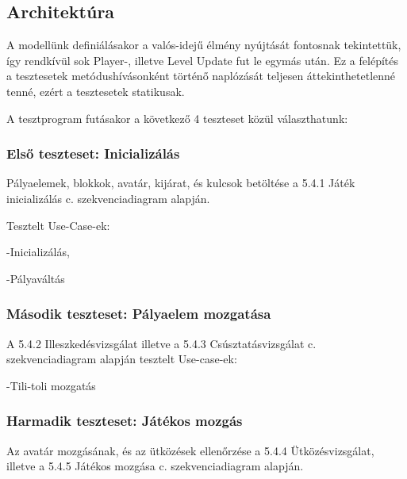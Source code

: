 \begin{usecase}
\end{usecase}

\begin{usecase}
\end{usecase}
\pagebreak 
\subsection{Architektúra}

	A modellünk definiálásakor a valós-idejű élmény nyújtását fontosnak tekintettük, így rendkívül sok Player-, illetve Level Update fut le egymás után. Ez a felépítés a tesztesetek metódushívásonként történő naplózását teljesen áttekinthetetlenné tenné, ezért a tesztesetek statikusak.

	A tesztprogram futásakor a következő 4 teszteset közül választhatunk:
	\subsubsection{Első teszteset: Inicializálás}
	Pályaelemek, blokkok, avatár, kijárat, és kulcsok betöltése a 5.4.1 Játék inicializálás c. szekvenciadiagram alapján. 
	
	Tesztelt Use-Case-ek:
	
	-Inicializálás, 
	
	-Pályaváltás
	
	\subsubsection{Második teszteset: Pályaelem mozgatása}
	A 5.4.2 Illeszkedésvizsgálat illetve a 5.4.3 Csúsztatásvizsgálat c. szekvenciadiagram alapján tesztelt Use-case-ek: 
	
	-Tili-toli mozgatás
	
	\subsubsection{Harmadik teszteset: Játékos mozgás}
	Az avatár mozgásának, és az ütközések ellenőrzése a 5.4.4 Ütközésvizsgálat, illetve a 5.4.5 Játékos mozgása c. szekvenciadiagram alapján.
	
